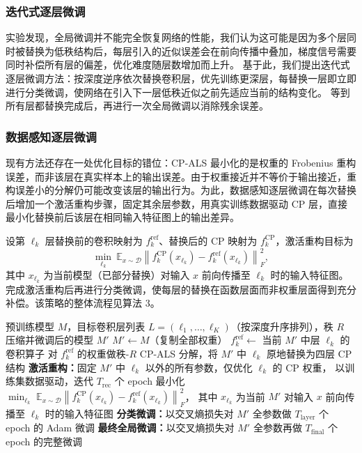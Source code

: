 \documentclass[11pt,a4paper,fontset=fandol]{ctexart}
\begin{document}
\subsubsection{迭代式逐层微调}
实验发现，全局微调并不能完全恢复网络的性能，我们认为这可能是因为多个层同时被替换为低秩结构后，每层引入的近似误差会在前向传播中叠加，梯度信号需要同时补偿所有层的偏差，优化难度随层数增加而上升。
基于此，我们提出迭代式逐层微调方法：按深度逆序依次替换卷积层，优先训练更深层，每替换一层即立即进行分类微调，使网络在引入下一层低秩近似之前先适应当前的结构变化。
等到所有层都替换完成后，再进行一次全局微调以消除残余误差。

\subsubsection{数据感知逐层微调}
现有方法还存在一处优化目标的错位：CP-ALS 最小化的是权重的 Frobenius 重构误差，而非该层在真实样本上的输出误差。由于权重接近并不等价于输出接近，重构误差小的分解仍可能改变该层的输出行为。为此，数据感知逐层微调在每次替换后增加一个激活重构步骤，固定其余层参数，用真实训练数据驱动 CP 层，直接最小化替换前后该层在相同输入特征图上的输出差异。

设第 $\ell_k$ 层替换前的卷积映射为 $f^{\mathrm{ref}}_k$、替换后的 CP 映射为 $f^{\mathrm{CP}}_k$，激活重构目标为
\begin{equation}
\min_{\ell_k}\ \mathbb{E}_{x\sim\mathcal{D}}\left\|f^{\mathrm{CP}}_k(x_{\ell_k})-f^{\mathrm{ref}}_k(x_{\ell_k})\right\|_F^2,
\end{equation}
其中 $x_{\ell_k}$ 为当前模型（已部分替换）对输入 $x$ 前向传播至 $\ell_k$ 时的输入特征图。完成激活重构后再进行分类微调，使每层的替换在函数层面而非权重层面得到充分补偿。该策略的整体流程见算法 3。

\begin{algorithm}[H]
\caption{数据感知逐层微调策略}
\begin{algorithmic}[1]
\Require 预训练模型 $M$，目标卷积层列表 $L=(\ell_1,\dots,\ell_K)$（按深度升序排列），秩 $R$
\Ensure 压缩并微调后的模型 $M'$
\State $M'\gets M$（复制全部权重）
  \State $f^{\mathrm{ref}}_k\gets$ 当前 $M'$ 中层 $\ell_k$ 的卷积算子
  \State 对 $f^{\mathrm{ref}}_k$ 的权重做秩-$R$ CP-ALS 分解，将 $M'$ 中 $\ell_k$ 原地替换为四层 CP 结构
  \State \textbf{激活重构：}固定 $M'$ 中 $\ell_k$ 以外的所有参数，仅优化 $\ell_k$ 的 CP 权重，
  \Statex \quad\qquad 以训练集数据驱动，迭代 $T_{\mathrm{rec}}$ 个 epoch 最小化
         $\displaystyle\min_{\ell_k}\;\mathbb{E}_{x\sim\mathcal{D}}\!\left\|f^{\mathrm{CP}}_k(x_{\ell_k})-f^{\mathrm{ref}}_k(x_{\ell_k})\right\|_F^2$，
  \Statex \quad\qquad 其中 $x_{\ell_k}$ 为当前 $M'$ 对输入 $x$ 前向传播至 $\ell_k$ 时的输入特征图
  \State \textbf{分类微调：}以交叉熵损失对 $M'$ 全参数做 $T_{\mathrm{layer}}$ 个 epoch 的 Adam 微调
\EndFor
\State \textbf{最终全局微调：}以交叉熵损失对 $M'$ 全参数再做 $T_{\mathrm{final}}$ 个 epoch 的完整微调
\end{algorithmic}
\end{algorithm}
\end{document}
